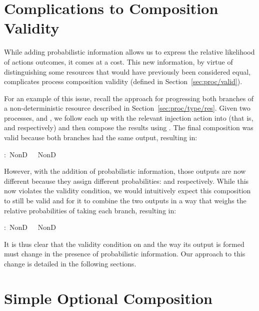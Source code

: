 \documentclass[class=smolathesis,crop=false]{standalone}
\begin{document}
\section{Complications to Composition Validity}
\label{sec:prob/complications}

While adding probabilistic information allows us to express the relative likelihood of actions outcomes, it comes at a cost.
This new information, by virtue of distinguishing some resources that would have previously been considered equal, complicates process composition validity (defined in Section~\ref{sec:proc/valid}).

For an example of this issue, recall the approach for progressing both branches of a non-deterministic resource described in Section~\ref{sec:proc/type/res}.
Given two processes,  and , we follow each up with the relevant injection action into  (that is,  and  respectively) and then compose the results using .
The final composition was valid because both branches had the same output, resulting in:
\begin{isabelle}
\centering
  :\ NonD\ \ \isasymrightarrow\ NonD\ 
\end{isabelle}

However, with the addition of probabilistic information, those outputs are now different because they assign different probabilities:  and  respectively.
While this now violates the validity condition, we would intuitively expect this composition to still be valid and for it to combine the two outputs in a way that weighs the relative probabilities of taking each branch, resulting in:
\begin{isabelle}
\centering
  :\ NonD\ \ \isasymrightarrow\ NonD\ 
\end{isabelle}

It is thus clear that the validity condition on  and the way its output is formed must change in the presence of probabilistic information.
Our approach to this change is detailed in the following sections.

\section{Simple Optional Composition}
\label{sec:prob/simple-opt}
\end{document}
